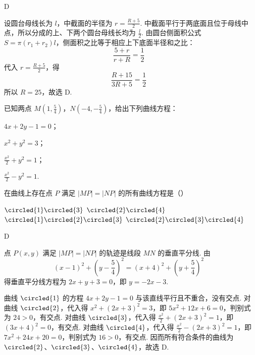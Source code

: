 \documentclass[UTF8,a4paper,oneside,11pt]{ctexbook}
\begin{document}
\begin{answer}
D
\end{answer}

\begin{solution}
设圆台母线长为 \(l\)，中截面的半径为 \(r=\frac{R+5}{2}\). 中截面平行于两底面且位于母线中点，所以分成的上、下两个圆台母线长均为 \(\frac{l}{2}\). 由圆台侧面积公式 \(S=\pi(r_1+r_2)l\)，侧面积之比等于相应上下底面半径和之比：
\[
\frac{5+r}{r+R}=\frac{1}{2}
\]
代入 \(r=\frac{R+5}{2}\)，得
\[
\frac{R+15}{3R+5}=\frac{1}{2}
\]
所以 \(R=25\)，故选 D.
\end{solution}

\begin{problem}
已知两点 \(M\left(1,\frac{5}{4}\right)\)，\(N\left(-4,-\frac{5}{4}\right)\)，给出下列曲线方程：

\begin{circlelist}
\item \(4x+2y-1=0\)；
\item \(x^{2}+y^{2}=3\)；
\item \(\frac{x^{2}}{2}+y^{2}=1\)；
\item \(\frac{x^{2}}{2}-y^{2}=1\).
\end{circlelist}

在曲线上存在点 \(P\) 满足 \(\left|MP\right|=\left|NP\right|\) 的所有曲线方程是（\quad）

\choices
    {\(\circled{1}\circled{3}\)}
    {\(\circled{2}\circled{4}\)}
    {\(\circled{1}\circled{2}\circled{3}\)}
    {\(\circled{2}\circled{3}\circled{4}\)}
\end{problem}

\begin{answer}
D
\end{answer}

\begin{solution}
点 \(P(x,y)\) 满足 \(\left|MP\right|=\left|NP\right|\) 的轨迹是线段 \(MN\) 的垂直平分线. 由
\[
(x-1)^2+\left(y-\frac{5}{4}\right)^2=(x+4)^2+\left(y+\frac{5}{4}\right)^2
\]
得垂直平分线方程为 \(2x+y+3=0\)，即 \(y=-2x-3\).

曲线 \(\circled{1}\) 的方程 \(4x+2y-1=0\) 与该直线平行且不重合，没有交点. 对曲线 \(\circled{2}\)，代入得
\(x^2+(2x+3)^2=3\)，即 \(5x^2+12x+6=0\)，判别式为 \(24>0\)，有交点. 对曲线 \(\circled{3}\)，代入得
\(\frac{x^2}{2}+(2x+3)^2=1\)，即 \((3x+4)^2=0\)，有交点. 对曲线 \(\circled{4}\)，代入得
\(\frac{x^2}{2}-(2x+3)^2=1\)，即 \(7x^2+24x+20=0\)，判别式为 \(16>0\)，有交点. 因而所有符合条件的曲线为 \(\circled{2}\)、\(\circled{3}\)、\(\circled{4}\)，故选 D.
\end{solution}
\end{document}

